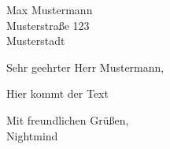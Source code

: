 \documentclass{letter}
\begin{document}
\begin{letter}{Max Mustermann\\Musterstraße 123\\Musterstadt}

    \opening{Sehr geehrter Herr Mustermann,}

    Hier kommt der Text

    \closing{Mit freundlichen Grüßen,\\Nightmind}

\end{letter}


\end{document}
